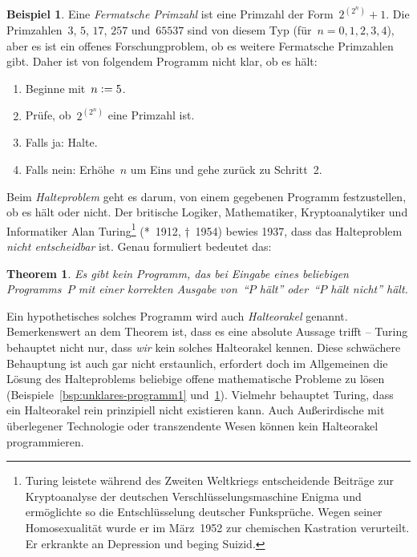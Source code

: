 \documentclass[twoside]{../zirkelblatt1415}
\theoremstyle{definition}
\newtheorem{bsp}[defn]{Beispiel}
\theoremstyle{plain}
\newtheorem{thm}[defn]{Theorem}
\theoremstyle{remark}
\newenvironment{listing}{
  \renewcommand*\theenumi{\arabic{enumi}}
  \renewcommand{\labelenumi}{\theenumi.}
  \begin{enumerate}\itemsep0em}{\end{enumerate}}
\newcommand{\defeq}{\vcentcolon=}
\begin{document}
\begin{bsp}\label{bsp:unklares-programm2}Eine \emph{Fermatsche Primzahl} ist eine Primzahl der
Form~$2^{(2^n)} + 1$. Die Primzahlen~$3$, $5$, $17$, $257$ und~$65537$ sind von
diesem Typ (für~$n = 0,1,2,3,4$), aber es ist ein offenes Forschungproblem, ob
es weitere Fermatsche Primzahlen gibt. Daher ist von folgendem Programm nicht
klar, ob es hält:
\begin{listing}
\item[1.] Beginne mit~$n \defeq 5$.
\item[2.] Prüfe, ob~$2^{(2^n)}$ eine Primzahl ist.
\item[3.] Falls ja: Halte.
\item[4.] Falls nein: Erhöhe~$n$ um Eins und gehe zurück zu Schritt~2.
\end{listing}
\end{bsp}

Beim \emph{Halteproblem} geht es darum, von einem gegebenen Programm
festzustellen, ob es hält oder nicht. Der britische Logiker, Mathematiker,
Kryptoanalytiker und Informatiker Alan Turing\footnote{Turing leistete während des
Zweiten Weltkriegs entscheidende Beiträge zur Kryptoanalyse der
deutschen Verschlüsselungsmaschine Enigma und ermöglichte so die
Entschlüsselung deutscher Funksprüche. Wegen seiner Homosexualität wurde er
im März~1952 zur chemischen Kastration verurteilt. Er erkrankte an
Depression und beging Suizid.} (*~1912, †~1954) bewies 1937, dass das Halteproblem
\emph{nicht entscheidbar} ist. Genau formuliert bedeutet das:

\begin{thm}Es gibt kein Programm, das bei Eingabe eines beliebigen Programms~$P$ mit einer
korrekten Ausgabe von~"`$P$ hält"' oder~"`$P$ hält nicht"' hält.\end{thm}

Ein hypothetisches solches Programm wird auch \emph{Halteorakel} genannt.
Bemerkenswert an dem Theorem ist, dass es eine absolute Aussage trifft --
Turing behauptet nicht nur, dass \emph{wir} kein solches Halteorakel kennen.
Diese schwächere Behauptung ist auch gar nicht erstaunlich, erfordert doch im
Allgemeinen die Lösung des Halteproblems beliebige offene mathematische
Probleme zu lösen (Beispiele~\ref{bsp:unklares-programm1} und~\ref{bsp:unklares-programm2}).
Vielmehr behauptet Turing, dass ein Halteorakel rein prinzipiell nicht
existieren kann. Auch Außerirdische mit überlegener Technologie oder
transzendente Wesen können kein Halteorakel programmieren.
\end{document}
